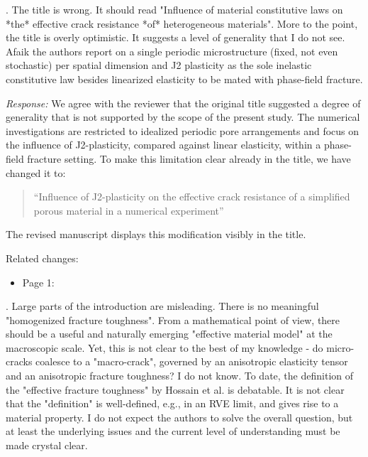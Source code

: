 \documentclass[pdflatex,sn-mathphys-num]{sn-jnl}
\begin{document}
\bigskip

. The title is wrong. It should read "Influence of material constitutive laws on *the* effective crack resistance *of* heterogeneous materials". More to the point, the title is overly optimistic. It suggests a level of generality that I do not see. Afaik the authors report on a single periodic microstructure (fixed, not even stochastic) per spatial dimension and J2 plasticity as the sole inelastic constitutive law besides linearized elasticity to be mated with phase-field fracture.

\emph{Response:} We agree with the reviewer that the original title suggested a degree of generality that is not supported by the scope of the present study. The numerical investigations are restricted to idealized periodic pore arrangements and focus on the influence of J2-plasticity, compared against linear elasticity, within a phase-field fracture setting. To make this limitation clear already in the title, we have changed it to:

\begin{quote}
``Influence of J2-plasticity on the effective crack resistance of a simplified porous material in a numerical experiment''
\end{quote}

The revised manuscript displays this modification visibly in the title.

Related changes:
\begin{itemize}
\item Page 1:  
\end{itemize}

\bigskip

. Large parts of the introduction are misleading. There is no meaningful "homogenized fracture toughness". From a mathematical point of view, there should be a useful and naturally emerging "effective material model" at the macroscopic scale. Yet, this is not clear to the best of my knowledge - do micro-cracks coalesce to a "macro-crack", governed by an anisotropic elasticity tensor and an anisotropic fracture toughness? I do not know. To date, the definition of the "effective fracture toughness" by Hossain et al. is debatable. It is not clear that the "definition" is well-defined, e.g., in an RVE limit, and gives rise to a material property. I do not expect the authors to solve the overall question, but at least the underlying issues and the current level of understanding must be made crystal clear.
\end{document}
